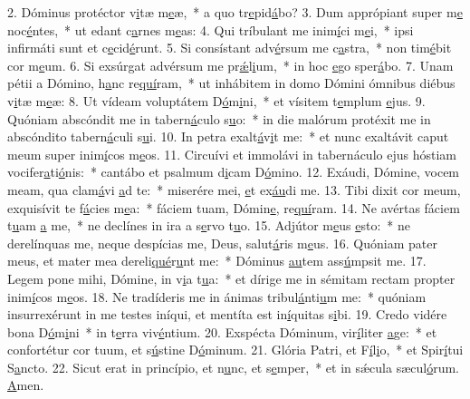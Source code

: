 2. Dóminus protéctor v\uline{i}tæ m\uline{e}æ,~* a quo tr\uline{e}pid\uline{á}bo?
3. Dum apprópiant super m\uline{e} noc\uline{é}ntes,~* ut edant c\uline{a}rnes m\uline{e}as:
4. Qui tríbulant me inim\uline{í}ci m\uline{e}i,~* ipsi infirmáti sunt et c\uline{e}cid\uline{é}runt.
5. Si consístant adv\uline{é}rsum me c\uline{a}stra,~* non tim\uline{é}bit cor m\uline{e}um.
6. Si exsúrgat advérsum me pr\uline{ǽ}l\uline{i}um,~* in hoc \uline{e}go sper\uline{á}bo.
7. Unam pétii a Dómino, h\uline{a}nc re\uline{quí}ram,~* ut inhábitem in domo Dómini ómnibus diébus v\uline{i}tæ m\uline{e}æ:
8. Ut vídeam voluptátem D\uline{ó}m\uline{i}ni,~* et vísitem t\uline{e}mplum \uline{e}jus.
9. Quóniam abscóndit me in tabern\uline{á}culo s\uline{u}o:~* in die malórum protéxit me in abscóndito tabern\uline{á}culi s\uline{u}i.
10. In petra exalt\uline{á}v\uline{i}t me:~* et nunc exaltávit caput meum super inim\uline{í}cos m\uline{e}os.
11. Circuívi et immolávi in tabernáculo ejus hóstiam vocifer\uline{a}ti\uline{ó}nis:~* cantábo et psalmum d\uline{i}cam D\uline{ó}mino.
12. Exáudi, Dómine, vocem meam, qua clam\uline{á}vi \uline{a}d te:~* miserére mei, \uline{e}t ex\uline{áu}di me.
13. Tibi dixit cor meum, exquisívit te f\uline{á}cies m\uline{e}a:~* fáciem tuam, Dómin\uline{e}, re\uline{quí}ram.
14. Ne avértas fáciem t\uline{u}am \uline{a} me,~* ne declínes in ira a s\uline{e}rvo t\uline{u}o.
15. Adjútor m\uline{e}us \uline{e}sto:~* ne derelínquas me, neque despícias me, Deus, salut\uline{á}ris m\uline{e}us.
16. Quóniam pater meus, et mater mea dereli\uline{qué}r\uline{u}nt me:~* Dóminus \uline{au}tem ass\uline{ú}mpsit me.
17. Legem pone mihi, Dómine, in v\uline{i}a t\uline{u}a:~* et dírige me in sémitam rectam propter inim\uline{í}cos m\uline{e}os.
18. Ne tradíderis me in ánimas tribul\uline{á}nti\uline{u}m me:~* quóniam insurrexérunt in me testes iníqui, et mentíta est in\uline{í}quitas s\uline{i}bi.
19. Credo vidére bona D\uline{ó}m\uline{i}ni~* in t\uline{e}rra viv\uline{é}ntium.
20. Exspécta Dóminum, vir\uline{í}liter \uline{a}ge:~* et confortétur cor tuum, et s\uline{ú}stine D\uline{ó}minum.
21. Glória Patri, et F\uline{í}l\uline{i}o,~* et Spir\uline{í}tui S\uline{a}ncto.
22. Sicut erat in princípio, et n\uline{u}nc, et s\uline{e}mper,~* et in sǽcula sæcul\uline{ó}rum. \uline{A}men.

